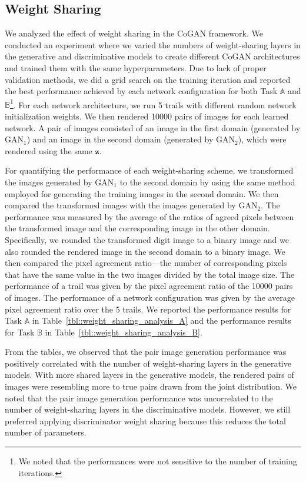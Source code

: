 \subsection{Weight Sharing}\label{subsec::sharing}

We analyzed the effect of weight sharing in the CoGAN framework. We conducted an experiment where we varied the numbers of weight-sharing layers in the generative and discriminative models to create different CoGAN architectures and trained them with the same hyperparameters. Due to lack of proper validation methods, we did a grid search on the training iteration and reported the best performance achieved by each network configuration for both Task $\mathbb{A}$ and $\mathbb{B}$\footnote{We noted that the performances were not sensitive to the number of training iterations.}. For each network architecture, we run 5 trails with different random network initialization weights. We then rendered 10000 pairs of images for each learned network. A pair of images consisted of an image in the first domain (generated by $\text{GAN}_1$) and an image in the second domain (generated by $\text{GAN}_2$), which were rendered using the same $\mathbf{z}$. 

For quantifying the performance of each weight-sharing scheme, we transformed the images generated by $\text{GAN}_1$ to the second domain by using the same method employed for generating the training images in the second domain. We then compared the transformed images with the images generated by $\text{GAN}_2$. The performance was measured by the average of the ratios of agreed pixels between the transformed image and the corresponding image in the other domain. Specifically, we rounded the transformed digit image to a binary image and we also rounded the rendered image in the second domain to a binary image. We then compared the pixel agreement ratio---the number of corresponding pixels that have the same value in the two images divided by the total image size. The performance of a trail was given by the pixel agreement ratio of the 10000 pairs of images. The performance of a network configuration was given by the average pixel agreement ratio over the 5 trails. We reported the performance results for Task $\mathbb{A}$ in Table~\ref{tbl::weight_sharing_analysis_A} and the performance results for Task $\mathbb{B}$ in Table~\ref{tbl::weight_sharing_analysis_B}.

From the tables, we observed that the pair image generation performance was positively correlated with the number of weight-sharing layers in the generative models. With more shared layers in the generative models, the rendered pairs of images were resembling more to true pairs drawn from the joint distribution. We noted that the pair image generation performance was uncorrelated to the number of weight-sharing layers in the discriminative models. However, we still preferred applying discriminator weight sharing because this reduces the total number of parameters. 

